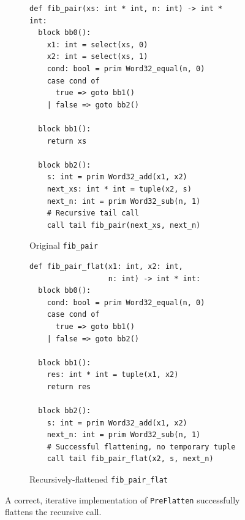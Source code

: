 \begin{figure}[htbp]
  \centering
  \begin{subfigure}[t]{0.48\textwidth}
    \caption{Original \texttt{fib\_pair}}
    \label{fig:good_flat_rec_func_orig}
    \vspace{1mm}
\begin{verbatim}
def fib_pair(xs: int * int, n: int) -> int * int:
  block bb0():
    x1: int = select(xs, 0)
    x2: int = select(xs, 1)
    cond: bool = prim Word32_equal(n, 0)
    case cond of
      true => goto bb1()
    | false => goto bb2()

  block bb1():
    return xs

  block bb2():
    s: int = prim Word32_add(x1, x2)
    next_xs: int * int = tuple(x2, s)
    next_n: int = prim Word32_sub(n, 1)
    # Recursive tail call
    call tail fib_pair(next_xs, next_n)
\end{verbatim}
  \end{subfigure}\hfill
  \begin{subfigure}[t]{0.48\textwidth}
    \caption{Recursively-flattened \texttt{fib\_pair\_flat}}
    \label{fig:good_flat_rec_func_flat}
    \vspace{1mm}
\begin{verbatim}
def fib_pair_flat(x1: int, x2: int,
                  n: int) -> int * int:
  block bb0():
    cond: bool = prim Word32_equal(n, 0)
    case cond of
      true => goto bb1()
    | false => goto bb2()

  block bb1():
    res: int * int = tuple(x1, x2)
    return res

  block bb2():
    s: int = prim Word32_add(x1, x2)
    next_n: int = prim Word32_sub(n, 1)
    # Successful flattening, no temporary tuple
    call tail fib_pair_flat(x2, s, next_n)
\end{verbatim}
  \end{subfigure}
  \caption{A correct, iterative implementation of \texttt{PreFlatten}
  successfully flattens the recursive call.}
  \label{fig:good_flat_rec_func_ssa}
\end{figure}




